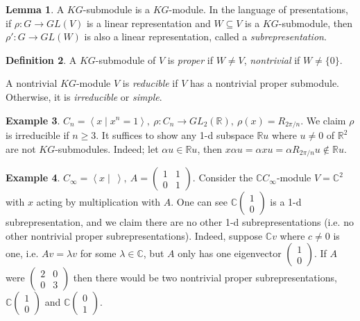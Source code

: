 \documentclass{article}
\newcommand{\la}{\left\langle}
\newcommand{\ra}{\right\rangle}
\newcommand{\R}{\mathbb{R}}
\newcommand{\C}{\mathbb{C}}
\theoremstyle{definition}
\newtheorem{defn}{Definition}[subsection]
\newtheorem{lemma}[defn]{Lemma}
\newtheorem{example}[defn]{Example}
\begin{document}
\begin{lemma}
A $KG$-submodule is a $KG$-module. In the language of presentations, if $\rho:G\rightarrow GL(V)$ is a linear representation and $W\subseteq V$ is a $KG$-submodule, then $\rho':G\rightarrow GL(W)$ is also a linear representation, called a \textit{subrepresentation}.
\end{lemma}

\begin{defn}
A $KG$-submodule of $V$ is \textit{proper} if $W\neq V$, \textit{nontrivial} if $W\neq \{0\}$.

A nontrivial $KG$-module $V$ is \textit{reducible} if $V$ has a nontrivial proper submodule. Otherwise, it is \textit{irreducible} or \textit{simple}.
\end{defn}

\begin{example}
\label{example:realrepofCnirreducible}
$C_n=\la x\mid x^n=1\ra,\ \rho:C_n\rightarrow GL_2(\R),\ \rho(x)=R_{2\pi/n}$. We claim $\rho$ is irreducible if $n\geq 3$. It suffices to show any 1-d subspace $\R u$ where $u\neq 0$ of $\R^2$ are not $KG$-submodules. Indeed; let $\alpha u\in\R u$, then $x\alpha u=\alpha xu=\alpha R_{2\pi/n}u\notin\R u$.
\end{example}

\begin{example}
\label{example:Cinfxactsby1101}
$C_\infty=\la x\mid \ \ra,\ A=\begin{pmatrix}1&1\\0&1\end{pmatrix}$. Consider the $\C C_\infty$-module $V=\C^2$ with $x$ acting by multiplication with $A$. One can see $\C\begin{pmatrix}1\\0\end{pmatrix}$ is a 1-d subrepresentation, and we claim there are no other 1-d subrepresentations (i.e. no other nontrivial proper subrepresentations). Indeed, suppose $\C v$ where $c\neq 0$ is one, i.e. $Av=\lambda v$ for some $\lambda\in\C$, but $A$ only has one eigenvector $\begin{pmatrix}1\\0\end{pmatrix}$. If $A$ were $\begin{pmatrix}2&0\\0&3\end{pmatrix}$ then there would be two nontrivial proper subrepresentations, $\C\begin{pmatrix}1\\0\end{pmatrix}$ and $\C\begin{pmatrix}0\\1\end{pmatrix}$.
\end{example}
\end{document}
